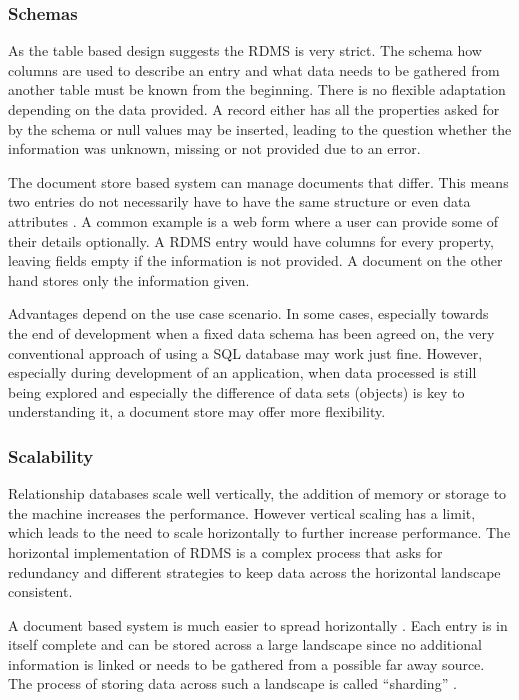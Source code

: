\subsubsection{Schemas}
As the table based design suggests the RDMS is very strict. The schema how columns are used to describe an entry and what data needs to be gathered from another table must be known from the beginning. There is no flexible adaptation depending on the data provided. A record either has all the properties asked for by the schema or null values may be inserted, leading to the question whether the information was unknown, missing or not provided due to an error.

The document store based system can manage documents that differ. This means two entries do not necessarily have to have the same structure or even data attributes \parencite{amazonNoSql}\parencite{objelean}. A common example is a web form where a user can provide some of their details optionally. A RDMS entry would have columns for every property, leaving fields empty if the information is not provided. A document on the other hand stores only the information given.

Advantages depend on the use case scenario. In some cases, especially towards the end of development when a fixed data schema has been agreed on, the very conventional approach of using a SQL database may work just fine. However, especially during development of an application, when data processed is still being explored and especially the difference of data sets (objects) is key to understanding it, a document store may offer more flexibility.
\subsubsection{Scalability}
Relationship databases scale well vertically, the addition of memory or storage to the machine increases the performance. However vertical scaling has a limit, which leads to the need to scale horizontally to further increase performance. The horizontal implementation of RDMS is a complex process that asks for redundancy and different strategies to keep data across the horizontal landscape consistent.

A document based system is much easier to spread horizontally \parencite{ian2016}\parencite{objelean}. Each entry is in itself complete and can be stored across a large landscape since no additional information is linked or needs to be gathered from a possible far away source. The process of storing data across such a landscape is called \enquote{sharding} \parencite{ian2016}.
